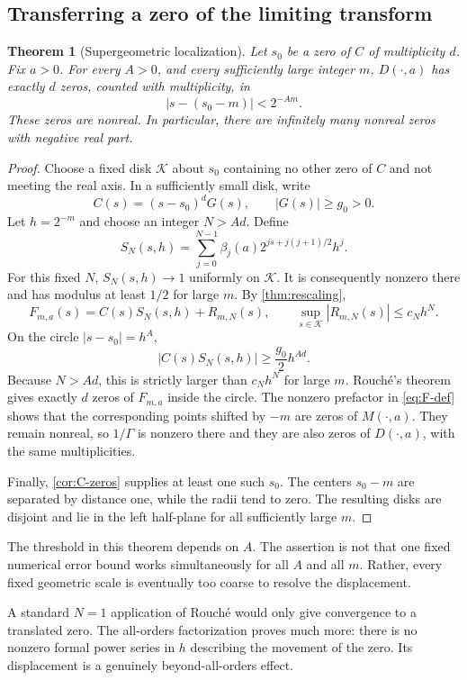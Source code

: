 \documentclass[11pt,a4paper]{article}
\numberwithin{equation}{section}
\newtheorem{theorem}{Theorem}[section]
\theoremstyle{definition}
\theoremstyle{remark}
\newcommand{\abs}[1]{\left|#1\right|}
\begin{document}
\subsection{Transferring a zero of the limiting transform}
\begin{theorem}[Supergeometric localization]
\label{thm:zero-strings}
Let $s_0$ be a zero of $C$ of multiplicity $d$. Fix $a>0$.
For every $A>0$, and every sufficiently large integer $m$,
$D(\cdot,a)$ has exactly $d$ zeros, counted with multiplicity, in
\begin{equation}
 \abs{s-(s_0-m)}<2^{-Am}.
 \label{eq:zero-disk}
\end{equation}
These zeros are nonreal. In particular, there are infinitely many
nonreal zeros with negative real part.
\end{theorem}
\begin{proof}
Choose a fixed disk $\mathcal K$ about $s_0$ containing no other zero
of $C$ and not meeting the real axis. In a sufficiently small disk,
write
\[
 C(s)=(s-s_0)^dG(s),\qquad \abs{G(s)}\ge g_0>0.
\]
Let $h=2^{-m}$ and choose an integer $N>Ad$. Define
\[
 S_N(s,h)=\sum_{j=0}^{N-1}
      \beta_j(a)2^{js+j(j+1)/2}h^j.
\]
For this fixed $N$, $S_N(s,h)\to1$ uniformly on $\mathcal K$.
It is consequently nonzero there and has modulus at least $1/2$
for large $m$. By \cref{thm:rescaling},
\[
 F_{m,a}(s)=C(s)S_N(s,h)+R_{m,N}(s),\qquad
 \sup_{s\in\mathcal K}\abs{R_{m,N}(s)}\le c_Nh^N.
\]
On the circle $\abs{s-s_0}=h^A$,
\[
 \abs{C(s)S_N(s,h)}\ge\frac{g_0}{2}h^{Ad}.
\]
Because $N>Ad$, this is strictly larger than $c_Nh^N$ for large
$m$. Rouch\'e's theorem gives exactly $d$ zeros of $F_{m,a}$ inside
the circle. The nonzero prefactor in \cref{eq:F-def} shows that the
corresponding points shifted by $-m$ are zeros of $M(\cdot,a)$.
They remain nonreal, so $1/\Gamma$ is nonzero there and they are
also zeros of $D(\cdot,a)$, with the same multiplicities.

Finally, \cref{cor:C-zeros} supplies at least one such $s_0$.
The centers $s_0-m$ are separated by distance one, while the radii
tend to zero. The resulting disks are disjoint and lie in the left
half-plane for all sufficiently large $m$.
\end{proof}

The threshold in this theorem depends on $A$. The assertion is not
that one fixed numerical error bound works simultaneously for all
$A$ and all $m$. Rather, every fixed geometric scale is eventually
too coarse to resolve the displacement.

A standard $N=1$ application of Rouch\'e would only give convergence
to a translated zero. The all-orders factorization proves much more:
there is no nonzero formal power series in $h$ describing the
movement of the zero. Its displacement is a genuinely
beyond-all-orders effect.
\end{document}
